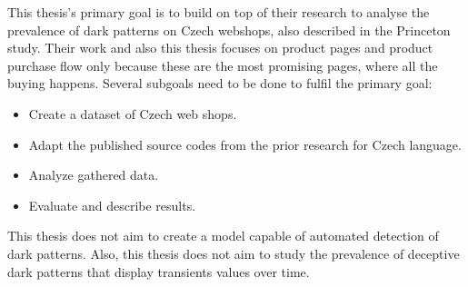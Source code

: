 This thesis's primary goal is to build on top of their research to analyse the prevalence of dark patterns on Czech webshops, also described in the Princeton study\cite{dark-patterns-at-scale}. Their work and also this thesis focuses on product pages and product purchase flow only because these are the most promising pages, where all the buying happens. Several subgoals need to be done to fulfil the primary goal:
\begin{itemize}
    \item Create a dataset of Czech web shops.
    \item Adapt the published source codes from the prior research for Czech language.
    \item Analyze gathered data.
    \item Evaluate and describe results.
\end{itemize}

This thesis does not aim to create a model capable of automated detection of dark patterns. Also, this thesis does not aim to study the prevalence of deceptive dark patterns that display transients values over time.
